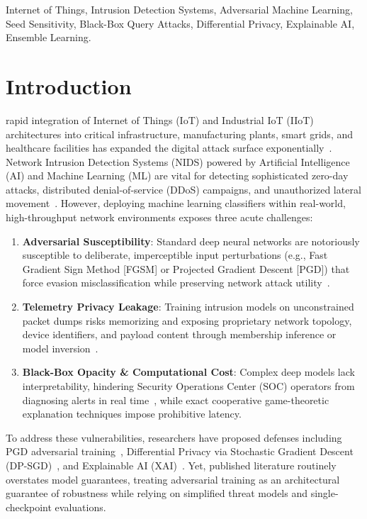 \documentclass[10pt,journal,compsoc,twocolumn]{IEEEtran}
\begin{document}
\begin{IEEEkeywords}
Internet of Things, Intrusion Detection Systems, Adversarial Machine Learning, Seed Sensitivity, Black-Box Query Attacks, Differential Privacy, Explainable AI, Ensemble Learning.
\end{IEEEkeywords}

\section{Introduction}
 rapid integration of Internet of Things (IoT) and Industrial IoT (IIoT) architectures into critical infrastructure, manufacturing plants, smart grids, and healthcare facilities has expanded the digital attack surface exponentially~\cite{harbi2024roadmap}. Network Intrusion Detection Systems (NIDS) powered by Artificial Intelligence (AI) and Machine Learning (ML) are vital for detecting sophisticated zero-day attacks, distributed denial-of-service (DDoS) campaigns, and unauthorized lateral movement~\cite{khazane2024holistic, isaaf2024framework}. However, deploying machine learning classifiers within real-world, high-throughput network environments exposes three acute challenges:
\begin{enumerate}
    \item \textbf{Adversarial Susceptibility}: Standard deep neural networks are notoriously susceptible to deliberate, imperceptible input perturbations (e.g., Fast Gradient Sign Method [FGSM] or Projected Gradient Descent [PGD]) that force evasion misclassification while preserving network attack utility~\cite{goodfellow2015explaining, madry2018towards}.
    \item \textbf{Telemetry Privacy Leakage}: Training intrusion models on unconstrained packet dumps risks memorizing and exposing proprietary network topology, device identifiers, and payload content through membership inference or model inversion~\cite{shokri2017membership, nasr2018machine}.
    \item \textbf{Black-Box Opacity \& Computational Cost}: Complex deep models lack interpretability, hindering Security Operations Center (SOC) operators from diagnosing alerts in real time~\cite{lundberg2017unified}, while exact cooperative game-theoretic explanation techniques impose prohibitive latency.
\end{enumerate}

To address these vulnerabilities, researchers have proposed defenses including PGD adversarial training~\cite{madry2018towards}, Differential Privacy via Stochastic Gradient Descent (DP-SGD)~\cite{abadi2016deep, mironov2017renyi}, and Explainable AI (XAI)~\cite{sharaf2024identifying, Frontiers2024evaluating}. Yet, published literature routinely overstates model guarantees, treating adversarial training as an architectural guarantee of robustness while relying on simplified threat models and single-checkpoint evaluations.
\end{document}
